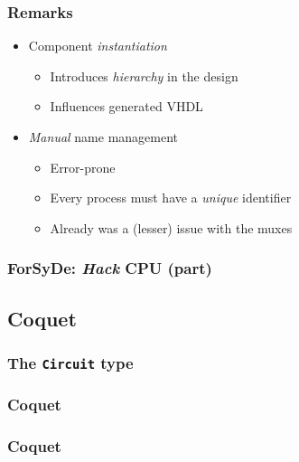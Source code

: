 \documentclass{beamer}
\begin{document}
            \begin{frame}
                \frametitle{Remarks}

                \begin{itemize}
                    \item Component \emph{instantiation}
                        \begin{itemize}
                            \item Introduces \emph{hierarchy} in the design
                            \item Influences generated VHDL
                        \end{itemize}
                    \item \emph{Manual} name management
                        \begin{itemize}
                            \item Error-prone
                            \item Every process must have a \emph{unique} identifier
                            \item Already was a (lesser) issue with the muxes
                        \end{itemize}
                \end{itemize}
            \end{frame}

            \begin{frame}
                \frametitle{ForSyDe: \emph{Hack} CPU (part)}
            \end{frame}


        \subsection{Coquet}
        \label{subsec:coquet}
            \begin{frame}
                \frametitle{The \texttt{Circuit} type}
            \end{frame}

            \begin{frame}
                \frametitle{Coquet}
            \end{frame}

            \begin{frame}
                \frametitle{Coquet}
            \end{frame}
\end{document}
